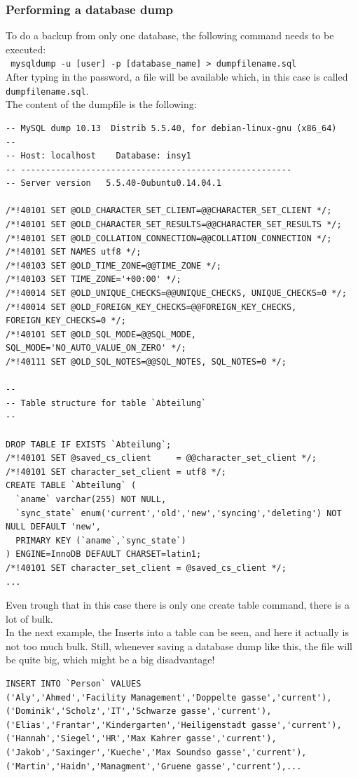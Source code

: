 \documentclass[10pt]{article}
\begin{document}
\subsubsection{Performing a database dump}
To do a backup from only one database, the following command needs to be executed: \\
\texttt{ mysqldump -u [user] -p [database\_name] \textgreater ~dumpfilename.sql } \\
After typing in the password, a file will be available which, in this case is called \texttt{dumpfilename.sql}.\\ 
The content of the dumpfile is the following:
\begin{lstlisting}    
-- MySQL dump 10.13  Distrib 5.5.40, for debian-linux-gnu (x86_64)
--
-- Host: localhost    Database: insy1
-- ------------------------------------------------------
-- Server version	5.5.40-0ubuntu0.14.04.1

/*!40101 SET @OLD_CHARACTER_SET_CLIENT=@@CHARACTER_SET_CLIENT */;
/*!40101 SET @OLD_CHARACTER_SET_RESULTS=@@CHARACTER_SET_RESULTS */;
/*!40101 SET @OLD_COLLATION_CONNECTION=@@COLLATION_CONNECTION */;
/*!40101 SET NAMES utf8 */;
/*!40103 SET @OLD_TIME_ZONE=@@TIME_ZONE */;
/*!40103 SET TIME_ZONE='+00:00' */;
/*!40014 SET @OLD_UNIQUE_CHECKS=@@UNIQUE_CHECKS, UNIQUE_CHECKS=0 */;
/*!40014 SET @OLD_FOREIGN_KEY_CHECKS=@@FOREIGN_KEY_CHECKS, FOREIGN_KEY_CHECKS=0 */;
/*!40101 SET @OLD_SQL_MODE=@@SQL_MODE, SQL_MODE='NO_AUTO_VALUE_ON_ZERO' */;
/*!40111 SET @OLD_SQL_NOTES=@@SQL_NOTES, SQL_NOTES=0 */;

--
-- Table structure for table `Abteilung`
--

DROP TABLE IF EXISTS `Abteilung`;
/*!40101 SET @saved_cs_client     = @@character_set_client */;
/*!40101 SET character_set_client = utf8 */;
CREATE TABLE `Abteilung` (
  `aname` varchar(255) NOT NULL,
  `sync_state` enum('current','old','new','syncing','deleting') NOT NULL DEFAULT 'new',
  PRIMARY KEY (`aname`,`sync_state`)
) ENGINE=InnoDB DEFAULT CHARSET=latin1;
/*!40101 SET character_set_client = @saved_cs_client */;
...
\end{lstlisting}    
Even trough that in this case there is only one create table command, there is a lot of bulk. \\
In the next example, the Inserts into a table can be seen, and here it actually is not too much bulk.
Still, whenever saving a database dump like this, the file will be quite big, which might be a big disadvantage! 
\begin{lstlisting}    
INSERT INTO `Person` VALUES 
('Aly','Ahmed','Facility Management','Doppelte gasse','current'),
('Dominik','Scholz','IT','Schwarze gasse','current'),
('Elias','Frantar','Kindergarten','Heiligenstadt gasse','current'),
('Hannah','Siegel','HR','Max Kahrer gasse','current'),
('Jakob','Saxinger','Kueche','Max Soundso gasse','current'),
('Martin','Haidn','Managment','Gruene gasse','current'),...
\end{lstlisting}    
\end{document}
